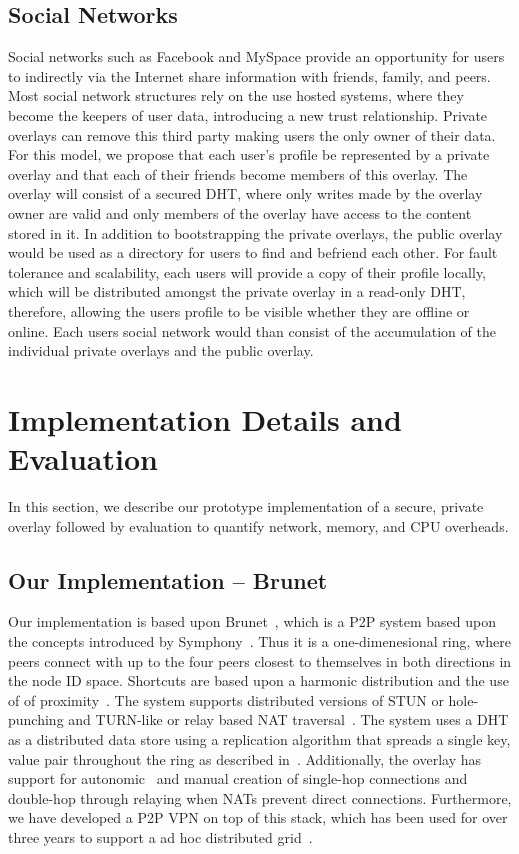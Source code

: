 \documentclass[conference]{IEEEtran}
\begin{document}
\subsection{Social Networks}
Social networks such as Facebook and MySpace provide an opportunity for users to
indirectly via the Internet share information with friends, family, and peers.
Most social network structures rely on the use hosted systems, where they become
the keepers of user data, introducing a new trust relationship.  Private overlays
can remove this third party making users the only owner of their data.  For this
model, we propose that each user's profile be represented by a private overlay
and that each of their friends become members of this overlay.  The overlay will
consist of a secured DHT, where only writes made by the overlay owner are valid
and only members of the overlay have access to the content stored in it.  In
addition to bootstrapping the private overlays, the public overlay would be
used as a directory for users to find and befriend each other.  For fault
tolerance and scalability, each users will provide a copy of their profile
locally, which will be distributed amongst the private overlay in a read-only
DHT, therefore, allowing the users profile to be visible whether they are
offline or online.  Each users social network would than consist of the
accumulation of the individual private overlays and the public overlay.

\section{Implementation Details and Evaluation}
\label{evaluations}
In this section, we describe our prototype implementation of a secure, private
overlay followed by evaluation to quantify network, memory, and CPU overheads.

\subsection{Our Implementation -- Brunet}
Our implementation is based upon Brunet~\cite{brunet}, which is a P2P system
based upon the concepts introduced by Symphony~\cite{symphony}.  Thus it is a
one-dimenesional ring, where peers connect with up to the four peers closest
to themselves in both directions in the node ID space.  Shortcuts are based
upon a harmonic distribution and the use of of proximity~\cite{hpdc08_0}.  The
system supports distributed versions of STUN or hole-punching and TURN-like or
relay based NAT traversal~\cite{nsdi10}.  The system uses a DHT as a distributed
data store using a replication algorithm that spreads a single key, value pair
throughout the ring as described in~\cite{pcgrid07}.  Additionally, the overlay
has support for autonomic~\cite{wow} and manual creation of single-hop
connections and double-hop through relaying when NATs prevent direct
connections.  Furthermore, we have developed a P2P VPN on top of this stack,
which has been used for over three years to support a ad hoc distributed
grid~\cite{archer, gridappliance}.
\end{document}
